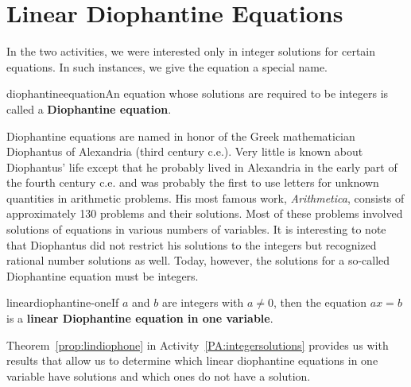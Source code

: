 \section{Linear Diophantine Equations} \label{S:diophantine}
%
\setcounter{previewactivity}{0}
%


%
In the two \typel activities, we were interested only in integer solutions for certain equations.  In such instances, we give the equation a special name.

\begin{defbox}{diophantineequation}{An equation whose solutions are required to be integers is called a \textbf{Diophantine equation}. }
%
\end{defbox}

Diophantine equations are named in honor of the Greek mathematician Diophantus of Alexandria
%
 (third century {\smallc c.e.}).  Very little is known about Diophantus' life except that he probably lived in Alexandria in the early part of the fourth century {\smallc c.e.} and was probably the first to use letters for unknown quantities in arithmetic problems.  His most famous work, \textit{Arithmetica}, consists of approximately 130 problems and their solutions.  Most of these problems involved solutions of equations in various numbers of variables. It is interesting to note that Diophantus did not restrict his solutions to the integers but recognized rational number solutions as well.  Today, however, the solutions for a so-called Diophantine equation must be integers. 

\begin{defbox}{lineardiophantine-one}{If $a$ and $b$ are integers with $a \ne 0$, then the equation
$ax = b$ is a \textbf{linear Diophantine equation in one variable}.
}
\end{defbox}
%
Theorem~\ref{prop:lindiophone} in  
\typeu Activity~\ref*{PA:integersolutions} provides us with results that allow us to determine which linear diophantine equations in one variable have solutions and which ones do not have a solution.
%

